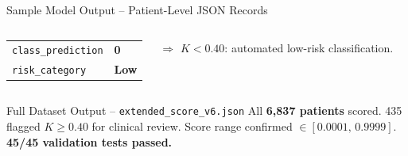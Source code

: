\documentclass[aspectratio=169]{beamer}
\begin{document}
\begin{frame}[fragile]{Sample Model Output -- Patient-Level JSON Records}
\begin{columns}[T]
\begin{center}
\begin{tabular}{@{}ll@{}}
        \texttt{class\_prediction}     & \textbf{0} \\
        \texttt{risk\_category}        & \textbf{Low} \\
        \bottomrule
      \end{tabular}
      \end{center}
      {\color{teal!80!black}\small $\Rightarrow$ $K{<}0.40$: automated low-risk classification.}
  \end{columns}
  \vspace{0.2em}
  \begin{block}{Full Dataset Output -- \texttt{extended\_score\_v6.json}}
    All \textbf{6,837 patients} scored. 435 flagged $K{\geq}0.40$ for clinical review.
    Score range confirmed $\in[0.0001,\,0.9999]$. \textbf{45/45 validation tests passed.}
  \end{block}
\end{frame}
\end{document}
